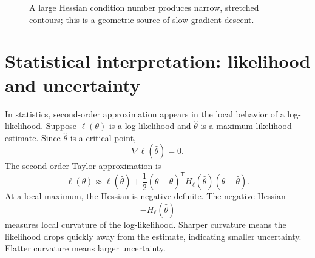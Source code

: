 \documentclass[11pt]{article}
\newcommand{\grad}{\nabla}
\newcommand{\T}{^{\mathsf T}}
\begin{document}
\begin{figure}[H]
\centering
{}
\caption{A large Hessian condition number produces narrow, stretched contours; this is a geometric source of slow gradient descent.}
\end{figure}

\section{Statistical interpretation: likelihood and uncertainty}

In statistics, second-order approximation appears in the local behavior of a log-likelihood. Suppose $\ell(\theta)$ is a log-likelihood and $\hat\theta$ is a maximum likelihood estimate. Since $\hat\theta$ is a critical point,
\[
\grad \ell(\hat\theta)=0.
\]
The second-order Taylor approximation is
\[
\ell(\theta)\approx \ell(\hat\theta)+\frac12(\theta-\hat\theta)\T H_\ell(\hat\theta)(\theta-\hat\theta).
\]
At a local maximum, the Hessian is negative definite. The negative Hessian
\[
-H_\ell(\hat\theta)
\]
measures local curvature of the log-likelihood. Sharper curvature means the likelihood drops quickly away from the estimate, indicating smaller uncertainty. Flatter curvature means larger uncertainty.
\end{document}
